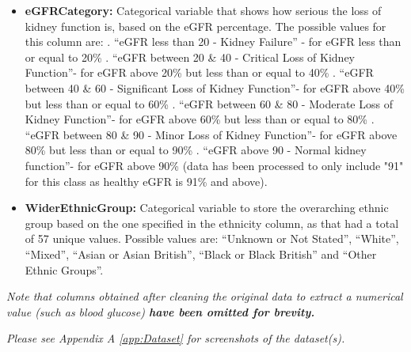 {\begin{itemize}
        \item \textbf{eGFR\textunderscore Category:} Categorical variable that shows how serious the loss of kidney function is, based on the eGFR percentage. The possible values for this column are: . ``eGFR less than 20 - Kidney Failure'' - for eGFR less than or equal to 20\% . ``eGFR between 20 \& 40 - Critical Loss of Kidney Function''- for eGFR above 20\% but less than or equal to 40\% . ``eGFR between 40 \& 60 - Significant Loss of Kidney Function''- for eGFR above 40\% but less than or equal to 60\% . ``eGFR between 60 \& 80 - Moderate Loss of Kidney Function''- for eGFR above 60\% but less than or equal to 80\% . ``eGFR between 80 \& 90 - Minor Loss of Kidney Function''- for eGFR above 80\% but less than or equal to 90\% . ``eGFR above 90 - Normal kidney function''- for eGFR above 90\% (data has been processed to only include "91" for this class as healthy eGFR is 91\% and above). \newline

        \item \textbf{Wider\textunderscore Ethnic\textunderscore Group:} Categorical variable to store the overarching ethnic group based on the one specified in the ethnicity column, as that had a total of 57 unique values. Possible values are: ``Unknown or Not Stated'', ``White'', ``Mixed'', ``Asian or Asian British'', ``Black or Black British'' and ``Other Ethnic Groups''.

    \end{itemize}

    \vspace{10pt}
    \noindent \textit{Note that columns obtained after cleaning the original data to extract a numerical value (such as blood glucose) \textbf{ have been omitted for brevity.}}

    \vspace{10pt}
    \noindent \textit{Please see Appendix A \space \autoref{app:Dataset} for screenshots of the dataset(s).}

}

